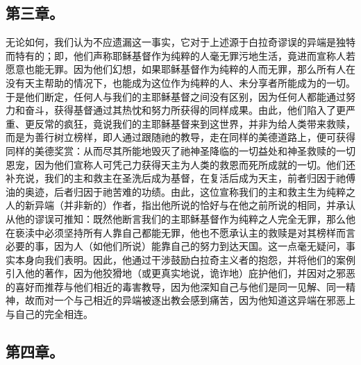 
\subsection{第三章。}

\par

无论如何，我们认为不应遗漏这一事实，它对于上述源于白拉奇谬误的异端是独特而特有的；即，他们声称耶稣基督作为纯粹的人毫无罪污地生活，竟进而宣称人若愿意也能无罪。因为他们幻想，如果耶稣基督作为纯粹的人而无罪，那么所有人在没有天主帮助的情况下，也能成为这位作为纯粹的人、未分享者所能成为的一切。于是他们断定，任何人与我们的主耶稣基督之间没有区别，因为任何人都能通过努力和奋斗，获得基督通过其热忱和努力所获得的同样成果。由此，他们陷入了更严重、更反常的疯狂，竟说我们的主耶稣基督来到这世界，并非为给人类带来救赎，而是为善行树立榜样，即人通过跟随祂的教导，走在同样的美德道路上，便可获得同样的美德奖赏：从而尽其所能地毁灭了祂神圣降临的一切益处和神圣救赎的一切恩宠，因为他们宣称人可凭己力获得天主为人类的救恩而死所成就的一切。他们还补充说，我们的主和救主在圣洗后成为基督，在复活后成为天主，前者归因于祂傅油的奥迹，后者归因于祂苦难的功绩。由此，这位宣称我们的主和救主生为纯粹之人的新异端（并非新的）作者，指出他所说的恰好与在他之前所说的相同，并承认从他的谬误可推知：既然他断言我们的主耶稣基督作为纯粹之人完全无罪，那么他在亵渎中必须坚持所有人靠自己都能无罪，他也不愿承认主的救赎是对其榜样而言必要的事，因为人（如他们所说）能靠自己的努力到达天国。这一点毫无疑问，事实本身向我们表明。因此，他通过干涉鼓励白拉奇主义者的抱怨，并将他们的案例引入他的著作，因为他狡猾地（或更真实地说，诡诈地）庇护他们，并因对之邪恶的喜好而推荐与他们相近的毒害教导，因为他深知自己与他们是同一见解、同一精神，故而对一个与己相近的异端被逐出教会感到痛苦，因为他知道这异端在邪恶上与自己的完全相连。\par


\subsection{第四章。}

\par

